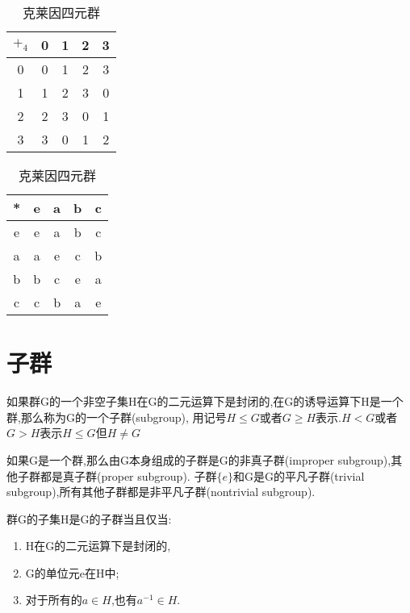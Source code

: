 \documentclass[oneside,openany]{ctexbook}
\begin{document}
\begin{table}[h!]
    \centering
    \begin{minipage}[t]{0.45\linewidth}
        \centering
        \small
        \caption{$\mathbb{Z}_4$}
        \begin{tabular}{c|c|c|c|c}
          $+_4$& 0& 1& 2& 3\\
          \hline
          0& 0& 1& 2& 3\\
          \hline
          1& 1& 2& 3& 0\\
          \hline
          2& 2& 3& 0& 1\\
          \hline
          3& 3& 0& 1& 2\\
        \end{tabular}
    \end{minipage}
    \hfill
    \begin{minipage}[t]{0.45\linewidth}
        \centering
        \small
        \caption{克莱因四元群}
        \begin{tabular}{c|c|c|c|c}
          *& e& a& b& c\\
          \hline
          e& e& a& b& c\\
          \hline
          a& a& e& c& b\\
          \hline
          b& b& c& e& a\\
          \hline
          c& c& b& a& e\\
        \end{tabular}
    \end{minipage}
\end{table}

\section{子群}

\begin{definition}{}{}
如果群G的一个非空子集H在G的二元运算下是封闭的,在G的诱导运算下H是一个群,那么称为G的一个子群(subgroup),
用记号$H\leqslant G$或者$G\geqslant H$表示.$H<G$或者$G>H$表示$H\leqslant G$但$H\neq G$
\end{definition}

\begin{definition}{}{}
如果G是一个群,那么由G本身组成的子群是G的非真子群(improper subgroup),其他子群都是真子群(proper subgroup).
子群$\{e\}$和G是G的平凡子群(trivial subgroup),所有其他子群都是非平凡子群(nontrivial subgroup).
\end{definition}

\begin{definition}{}{}
群G的子集H是G的子群当且仅当:
\begin{enumerate}
  \item H在G的二元运算下是封闭的,
  \item G的单位元e在H中;
  \item 对于所有的$a\in H$,也有$a^{-1}\in H$.
\end{enumerate}
\end{definition}
\end{document}
